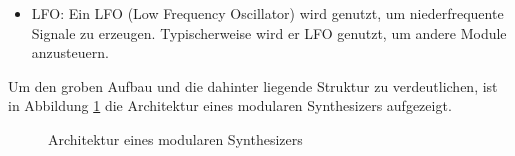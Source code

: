 \begin{itemize}
	\item LFO: \newline
	Ein LFO (Low Frequency Oscillator) wird genutzt, um niederfrequente Signale zu erzeugen.
	Typischerweise wird er LFO genutzt, um andere Module anzusteuern.
	
	
\end{itemize}

Um den groben Aufbau und die dahinter liegende Struktur zu verdeutlichen, ist in Abbildung \ref{fig:Produktarchitektur} die Architektur eines modularen Synthesizers aufgezeigt.

\begin{figure}[h]
	\centering
	\setlength{\fboxsep}{1pt} %
	\setlength{\fboxrule}{1pt} %
	\caption{Architektur eines  modularen Synthesizers}
	\label{fig:Produktarchitektur}
\end{figure}


%




